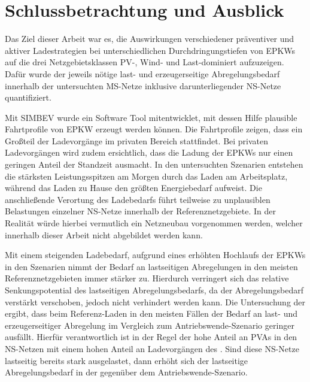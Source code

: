 \section{Schlussbetrachtung und Ausblick}\label{chap:schlussbetrachtung}

Das Ziel dieser Arbeit war es, die Auswirkungen verschiedener präventiver und aktiver Ladestrategien bei unterschiedlichen Durchdringungstiefen von \glspl{EPKW} auf die drei Netzgebietsklassen \gls{PV}-, Wind- und Last-dominiert aufzuzeigen.
Dafür wurde der jeweils nötige last- und erzeugerseitige Abregelungsbedarf innerhalb der untersuchten \gls{MS}-Netze inklusive darunterliegender \gls{NS}-Netze quantifiziert.\medskip

Mit \gls{SIMBEV} wurde ein Software Tool mitentwicklet, mit dessen Hilfe plausible Fahrtprofile von \gls{EPKW} erzeugt werden können.
Die Fahrtprofile zeigen, dass ein Großteil der Ladevorgänge im privaten Bereich stattfindet.
Bei privaten Ladevorgängen wird zudem ersichtlich, dass die Ladung der \glspl{EPKW} nur einen geringen Anteil der Standzeit ausmacht.
In den untersuchten Szenarien entstehen die stärksten Leistungsspitzen am Morgen durch das Laden am Arbeitsplatz, während das Laden zu Hause den größten Energiebedarf aufweist.
Die anschließende Verortung des Ladebedarfs führt teilweise zu unplausiblen Belastungen einzelner \gls{NS}-Netze innerhalb der Referenznetzgebiete.
In der Realität würde hierbei vermutlich ein Netzneubau vorgenommen werden, welcher innerhalb dieser Arbeit nicht abgebildet werden kann.\medskip

Mit einem steigenden Ladebedarf, aufgrund eines erhöhten Hochlaufs der \glspl{EPKW} in den Szenarien nimmt der Bedarf an lastseitigen Abregelungen in den meisten Referenznetzgebieten immer stärker zu.
Hierdurch verringert sich das relative Senkungspotential des lastseitigen Abregelungsbedarfs, da der Abregelungsbedarf verstärkt verschoben, jedoch nicht verhindert werden kann.
Die Untersuchung der \SzeFirmenparkplatz ergibt, dass beim Referenz-Laden in den meisten Fällen der Bedarf an last- und erzeugerseitiger Abregelung im Vergleich zum Antriebswende-Szenario geringer ausfällt.
Hierfür verantwortlich ist in der Regel der hohe Anteil an \glspl{PVA} in den \gls{NS}-Netzen mit einem hohen Anteil an Ladevorgängen des \UC \zHdot.
Sind diese \gls{NS}-Netze lastseitig bereits stark ausgelastet, dann erhöht sich der lastseitige Abregelungsbedarf in der \SzeFirmenparkplatz gegenüber dem Antriebswende-Szenario.\medskip

